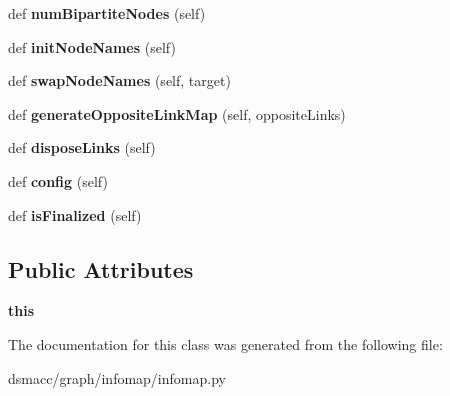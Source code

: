 \begin{DoxyCompactItemize}
def {\bfseries num\+Bipartite\+Nodes} (self)
\item 
\mbox{\label{classdsmacc_1_1graph_1_1infomap_1_1infomap_1_1Network_a9e65f4db113e370df9b4e390af1a04ee}} 
def {\bfseries init\+Node\+Names} (self)
\item 
\mbox{\label{classdsmacc_1_1graph_1_1infomap_1_1infomap_1_1Network_a38d12974e31f55fc977b92dfab8e0b1a}} 
def {\bfseries swap\+Node\+Names} (self, target)
\item 
\mbox{\label{classdsmacc_1_1graph_1_1infomap_1_1infomap_1_1Network_ab3520a8bbdf1d6aac4ff701be473acfc}} 
def {\bfseries generate\+Opposite\+Link\+Map} (self, opposite\+Links)
\item 
\mbox{\label{classdsmacc_1_1graph_1_1infomap_1_1infomap_1_1Network_aba2252bad7177c28e5c88b266899771b}} 
def {\bfseries dispose\+Links} (self)
\item 
\mbox{\label{classdsmacc_1_1graph_1_1infomap_1_1infomap_1_1Network_ae76294616ab504107b7cb256f7ca4faf}} 
def {\bfseries config} (self)
\item 
\mbox{\label{classdsmacc_1_1graph_1_1infomap_1_1infomap_1_1Network_a9e6c773a60ddfed6013770323c70854f}} 
def {\bfseries is\+Finalized} (self)
\end{DoxyCompactItemize}
\subsection*{Public Attributes}
\begin{DoxyCompactItemize}
\item 
\mbox{\label{classdsmacc_1_1graph_1_1infomap_1_1infomap_1_1Network_a7e5865ee24e036a032c9a7882f2c8f9f}} 
{\bfseries this}
\end{DoxyCompactItemize}


The documentation for this class was generated from the following file\+:\begin{DoxyCompactItemize}
\item 
dsmacc/graph/infomap/infomap.\+py\end{DoxyCompactItemize}
